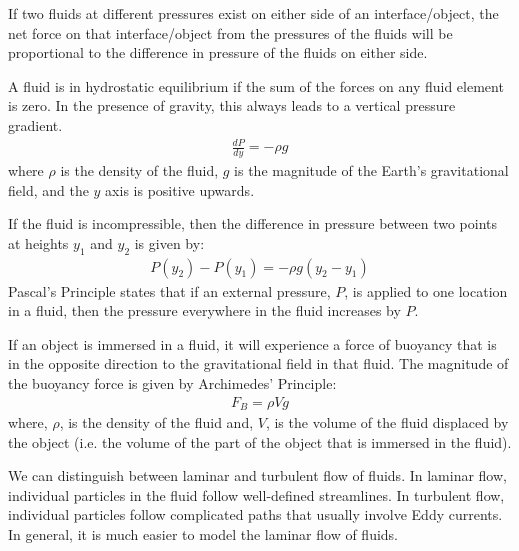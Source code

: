 {{\begin{chapterSummary}
If two fluids at different pressures exist on either side of an interface/object, the net force on that interface/object from the pressures of the fluids will be proportional to the difference in pressure of the fluids on either side.

A fluid is in hydrostatic equilibrium if the sum of the forces on any fluid element is zero. In the presence of gravity, this always leads to a vertical pressure gradient.
\begin{align*}
\frac{dP}{dy}=-\rho g
\end{align*}
where $\rho$ is the density of the fluid, $g$ is the magnitude of the Earth's gravitational field, and the $y$ axis is positive upwards. 

If the fluid is incompressible, then the difference in pressure between two points at heights $y_1$ and $y_2$ is given by:
\begin{align*}
P(y_2)-P(y_1) =-\rho g (y_2-y_1)
\end{align*}
Pascal's Principle states that if an external pressure, $P$, is applied to one location in a fluid, then the pressure everywhere in the fluid increases by $P$.

If an object is immersed in a fluid, it will experience a force of buoyancy that is in the opposite direction to the gravitational field in that fluid. The magnitude of the buoyancy force is given by Archimedes' Principle:
\begin{align*}
F_B = \rho Vg
\end{align*}
where, $\rho$, is the density of the fluid and, $V$, is the volume of the fluid displaced by the object (i.e. the volume of the part of the object that is immersed in the fluid). 

We can distinguish between laminar and turbulent flow of fluids. In laminar flow, individual particles in the fluid follow well-defined streamlines. In turbulent flow, individual particles follow complicated paths that usually involve Eddy currents. In general, it is much easier to model the laminar flow of fluids.


\end{chapterSummary}}}
